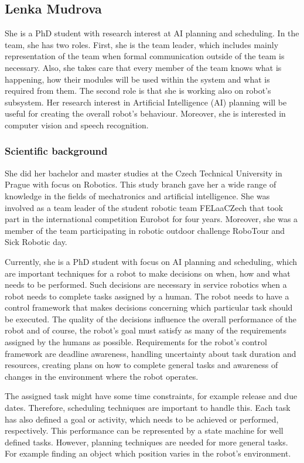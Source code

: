 \documentclass[conference]{IEEEtran}
\begin{document}
\subsection{Lenka Mudrova}

She is a PhD student with research interest at AI planning and scheduling. In the team, she has two roles. First, she is the team leader, which includes mainly representation of the team when formal communication outside of the team is necessary. Also, she takes care that every member of the team knows what is happening, how their modules will be used within the system and what is required from them. The second role is that she is working also on robot's subsystem. Her research interest in Artificial Intelligence (AI) planning will be useful for creating the overall robot's behaviour. Moreover, she is interested in computer vision and speech recognition. 

\subsubsection*{Scientific background}
She did her bachelor and master studies at the Czech Technical University in Prague with focus on Robotics. This study branch gave her a wide range of knowledge in the fields of mechatronics and artificial intelligence. She was involved as a team leader of the student robotic team FELaaCZech that took part in the international competition Eurobot for four years. Moreover, she was a member of the team participating in robotic outdoor challenge RoboTour and Sick Robotic day. 

Currently, she is a PhD student with focus on AI planning and scheduling, which are important techniques for a robot to make decisions on when, how and what needs to be performed. Such decisions are necessary in service robotics when a robot needs to complete tasks assigned by a human. The robot needs to have a control framework that makes decisions concerning which particular task should be executed. The quality of the decisions influence the overall performance of the robot and of course, the robot's goal must satisfy as many of the requirements assigned by the humans as possible. Requirements for the robot's control framework are deadline awareness, handling uncertainty about task duration and resources, creating plans on how to complete general tasks and awareness of changes in the environment where the robot operates. 

The assigned task might have some time constraints, for example release and due dates. Therefore, scheduling techniques are important to handle this. Each task has also defined a goal or activity, which needs to be achieved or performed, respectively. This performance can be represented by a state machine for well defined tasks. However, planning techniques are needed for more general tasks. For example finding an object which position varies in the robot's environment.
\end{document}
